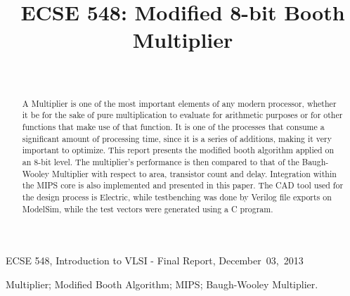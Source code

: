\documentclass[journal]{IEEEtran}
\begin{document}
\title{ECSE 548: Modified 8-bit Booth Multiplier}
\author{\\
}

%
{ECSE 548, Introduction to VLSI - Final Report, December~03,~2013}

\maketitle
\IEEEpeerreviewmaketitle


\graphicspath{ {./figures/} }


\begin{abstract}
A Multiplier is one of the most important elements of any modern processor, whether it be for the sake of pure multiplication to evaluate for arithmetic purposes or for other functions that make use of that function. It is one of the processes that consume a significant amount of processing time, since it is a series of additions, making it very important to optimize. This report presents the modified booth algorithm applied on an 8-bit level. The multiplier’s performance is then compared to that of the Baugh-Wooley Multiplier with respect to area, transistor count and delay. Integration within the MIPS core is also implemented and presented in this paper. The CAD tool used for the design process is Electric, while testbenching was done by Verilog file exports on ModelSim, while the test vectors were generated using a C program.
\end{abstract}



\begin{IEEEkeywords}
Multiplier; Modified Booth Algorithm; MIPS; Baugh-Wooley Multiplier.
\end{IEEEkeywords}
\end{document}
